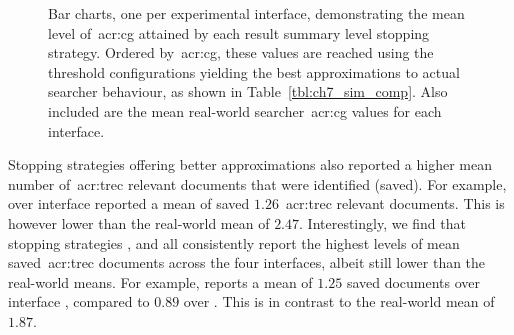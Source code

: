 \begin{figure}[p!]
    \centering
    \caption[Simulated and real-world~\gls{acr:cg} rankings]{Bar charts, one per experimental interface, demonstrating the mean level of~\gls{acr:cg} attained by each result summary level stopping strategy. Ordered by~\gls{acr:cg}, these values are reached using the threshold configurations yielding the best approximations to actual searcher behaviour, as shown in Table~\ref{tbl:ch7_sim_comp}. Also included are the mean real-world searcher~\gls{acr:cg} values for each interface.}
    \label{fig:ch7_sim_comparison_rankings}
\end{figure}

Stopping strategies offering better approximations also reported a higher mean number of~\gls{acr:trec} relevant documents that were identified (saved). For example,  over interface  reported a mean of saved $1.26$~\gls{acr:trec} relevant documents. This is however lower than the real-world mean of $2.47$. Interestingly, we find that stopping strategies ,  and  all consistently report the highest levels of mean saved~\gls{acr:trec} documents across the four interfaces, albeit still lower than the real-world means. For example,  reports a mean of $1.25$ saved documents over interface , compared to $0.89$ over . This is in contrast to the real-world mean of $1.87$.

